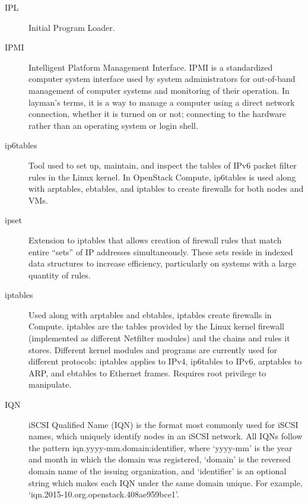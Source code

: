 \documentclass[letterpaper,10pt,english]{sphinxmanual}
\begin{document}
\begin{description}
\item[{IPL}] \leavevmode{}\label{_source/glossary:term-ipl}
Initial Program Loader.

\item[{IPMI}] \leavevmode{}\label{_source/glossary:term-ipmi}
Intelligent Platform Management Interface. IPMI is a
standardized computer system interface used by system administrators
for out-of-band management of computer systems and monitoring of their
operation. In layman's terms, it
is a way to manage a computer using a direct network connection,
whether it is turned on or not; connecting to the hardware rather than
an operating system or login shell.

\item[{ip6tables}] \leavevmode{}\label{_source/glossary:term-ip6tables}
Tool used to set up, maintain, and inspect the tables of IPv6
packet filter rules in the Linux kernel. In OpenStack Compute,
ip6tables is used along with arptables, ebtables, and iptables to
create firewalls for both nodes and VMs.

\item[{ipset}] \leavevmode{}\label{_source/glossary:term-ipset}
Extension to iptables that allows creation of firewall rules
that match entire ``sets'' of IP addresses simultaneously. These
sets reside in indexed data structures to increase efficiency,
particularly on systems with a large quantity of rules.

\item[{iptables}] \leavevmode{}\label{_source/glossary:term-iptables}
Used along with arptables and ebtables, iptables create
firewalls in Compute. iptables are the tables provided by the Linux
kernel firewall (implemented as different Netfilter modules) and the
chains and rules it stores. Different kernel modules and programs are
currently used for different protocols: iptables applies to IPv4,
ip6tables to IPv6, arptables to ARP, and ebtables to Ethernet frames.
Requires root privilege to manipulate.

\item[{IQN}] \leavevmode{}\label{_source/glossary:term-iqn}
iSCSI Qualified Name (IQN) is the format most commonly used
for iSCSI names, which uniquely identify nodes in an iSCSI network.
All IQNs follow the pattern iqn.yyyy-mm.domain:identifier, where
`yyyy-mm' is the year and month in which the domain was registered,
`domain' is the reversed domain name of the issuing organization, and
`identifier' is an optional string which makes each IQN under the same
domain unique. For example, `iqn.2015-10.org.openstack.408ae959bce1'.


\end{description}
\end{document}
